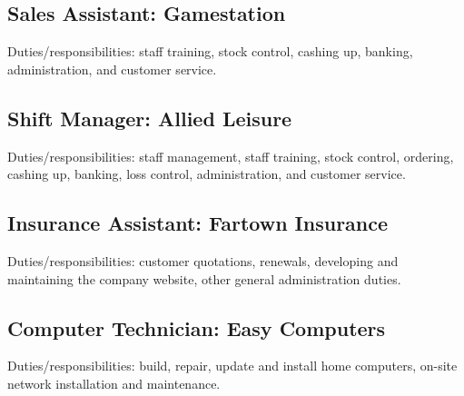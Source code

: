 \documentclass{article}
\begin{document}
\subsection*{Sales Assistant: Gamestation}
\label{sec-3.2}

Duties/responsibilities: staff training, stock control, cashing up, banking, administration, and customer service.
\subsection*{Shift Manager: Allied Leisure}
\label{sec-3.3}

Duties/responsibilities: staff management, staff training, stock control, ordering, cashing up, banking, loss control, administration, and customer service.
\subsection*{Insurance Assistant: Fartown Insurance}
\label{sec-3.4}

Duties/responsibilities: customer quotations, renewals, developing and maintaining the company website, other general administration duties.
\subsection*{Computer Technician: Easy Computers}
\label{sec-3.5}

Duties/responsibilities: build, repair, update and install home computers, on-site network installation and maintenance.
\end{document}
